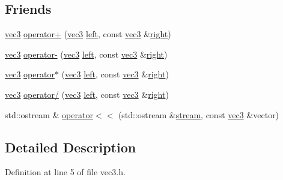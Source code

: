 \subsection*{Friends}
\begin{DoxyCompactItemize}
\item 
\hyperlink{structu__engine_1_1maths_1_1vec3}{vec3} \hyperlink{structu__engine_1_1maths_1_1vec3_ab5ababcc661860b3e72144fa98a0bcc5}{operator+} (\hyperlink{structu__engine_1_1maths_1_1vec3}{vec3} \hyperlink{glew_8h_a6358510bdde486b81c7951ee5c470ee4}{left}, const \hyperlink{structu__engine_1_1maths_1_1vec3}{vec3} \&\hyperlink{glew_8h_a18826d74cd7b4e758c25b4ba66e20be2}{right})
\item 
\hyperlink{structu__engine_1_1maths_1_1vec3}{vec3} \hyperlink{structu__engine_1_1maths_1_1vec3_ac0df6ad93c455d7fb2c2d73dc75b8f65}{operator-\/} (\hyperlink{structu__engine_1_1maths_1_1vec3}{vec3} \hyperlink{glew_8h_a6358510bdde486b81c7951ee5c470ee4}{left}, const \hyperlink{structu__engine_1_1maths_1_1vec3}{vec3} \&\hyperlink{glew_8h_a18826d74cd7b4e758c25b4ba66e20be2}{right})
\item 
\hyperlink{structu__engine_1_1maths_1_1vec3}{vec3} \hyperlink{structu__engine_1_1maths_1_1vec3_a02f8c1e00fe963541dbbc13a4790c651}{operator$\ast$} (\hyperlink{structu__engine_1_1maths_1_1vec3}{vec3} \hyperlink{glew_8h_a6358510bdde486b81c7951ee5c470ee4}{left}, const \hyperlink{structu__engine_1_1maths_1_1vec3}{vec3} \&\hyperlink{glew_8h_a18826d74cd7b4e758c25b4ba66e20be2}{right})
\item 
\hyperlink{structu__engine_1_1maths_1_1vec3}{vec3} \hyperlink{structu__engine_1_1maths_1_1vec3_af38169a8a95a92def18943d0c4836f16}{operator/} (\hyperlink{structu__engine_1_1maths_1_1vec3}{vec3} \hyperlink{glew_8h_a6358510bdde486b81c7951ee5c470ee4}{left}, const \hyperlink{structu__engine_1_1maths_1_1vec3}{vec3} \&\hyperlink{glew_8h_a18826d74cd7b4e758c25b4ba66e20be2}{right})
\item 
std\+::ostream \& \hyperlink{structu__engine_1_1maths_1_1vec3_a5fc8e41707a3afaebd2005b8e8cd48dd}{operator$<$$<$} (std\+::ostream \&\hyperlink{glew_8h_a10d3bc96cdfc1d478f52c13d5ffd9316}{stream}, const \hyperlink{structu__engine_1_1maths_1_1vec3}{vec3} \&vector)
\end{DoxyCompactItemize}


\subsection{Detailed Description}


Definition at line 5 of file vec3.\+h.



